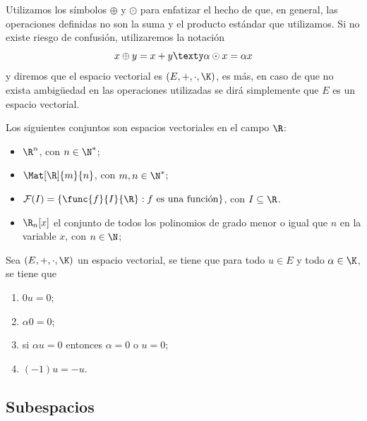 \documentclass[a4,11pt]{aleph-notas}
\begin{document}
\begin{advertencia}
    Utilizamos los símbolos $\oplus$ y $\odot$ para enfatizar el hecho de que, en general, las operaciones definidas no son la suma y el producto estándar que utilizamos. Si no existe riesgo de confusión, utilizaremos la notación
    \[
        x\oplus y = x+y
        \texty
        \alpha \odot x = \alpha x
    \]
    y diremos que el espacio vectorial es $(E,+,\cdot,\K)$, es más, en caso de que no exista ambigüedad en las operaciones utilizadas se dirá simplemente que $E$ es un espacio vectorial.
\end{advertencia}

\begin{teo}
    Los siguientes conjuntos son espacios vectoriales en el campo $\R$:
    \begin{itemize}
    \item
        $\R^n$, con $n\in \N^*$;
    \item
        $\Mat[\R]{m}{n}$, con $m,n\in \N^*$;
    \item
        $\mathcal{F}(I)=\{\func{f}{I}{\R}: f\text{ es una función}\}$, con $I\subseteq \R$.
    \item
        $\R_n[x]$ el conjunto de todos los polinomios de grado menor o igual que $n$ en la variable $x$, con $n\in \N$;
    \end{itemize}
\end{teo}

\begin{teo}
    Sea $(E,+,\cdot,\K)$ un espacio vectorial, se tiene que para todo $u \in E$ y todo $\alpha \in \K$, se tiene que
    \begin{enumerate}
        \item $0u = 0$;
        \item $\alpha 0 = 0$;
        \item si $\alpha u=0$ entonces $\alpha  = 0$ o $u = 0$;
        \item $(-1) u = -u$.
    \end{enumerate}
\end{teo}

\subsection{Subespacios}
\end{document}
